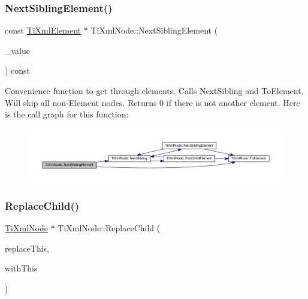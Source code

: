 \subsubsection{\texorpdfstring{Next\+Sibling\+Element()}{NextSiblingElement()}\hspace{0.1cm}{\footnotesize\ttfamily [2/2]}}
{\footnotesize\ttfamily const \hyperlink{classTiXmlElement}{Ti\+Xml\+Element} $\ast$ Ti\+Xml\+Node\+::\+Next\+Sibling\+Element (\begin{DoxyParamCaption}\item[{const char $\ast$}]{\+\_\+value }\end{DoxyParamCaption}) const}

Convenience function to get through elements. Calls Next\+Sibling and To\+Element. Will skip all non-\/\+Element nodes. Returns 0 if there is not another element. Here is the call graph for this function\+:
\nopagebreak
\begin{figure}[H]
\begin{center}
\leavevmode
\includegraphics[width=350pt]{classTiXmlNode_a22def4746238abaee042f99b47ef3c94_cgraph}
\end{center}
\end{figure}
\mbox{\label{classTiXmlNode_a543208c2c801c84a213529541e904b9f}} 
\subsubsection{\texorpdfstring{Replace\+Child()}{ReplaceChild()}}
{\footnotesize\ttfamily \hyperlink{classTiXmlNode}{Ti\+Xml\+Node} $\ast$ Ti\+Xml\+Node\+::\+Replace\+Child (\begin{DoxyParamCaption}\item[{\hyperlink{classTiXmlNode}{Ti\+Xml\+Node} $\ast$}]{replace\+This,  }\item[{const \hyperlink{classTiXmlNode}{Ti\+Xml\+Node} \&}]{with\+This }\end{DoxyParamCaption})}

